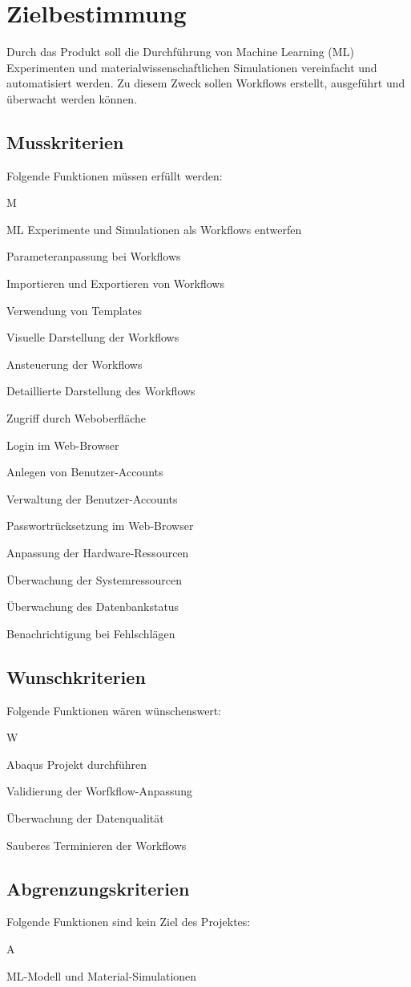 \section{Zielbestimmung} 
Durch das Produkt soll die Durchführung von Machine Learning (ML) Experimenten und materialwissenschaftlichen Simulationen vereinfacht und automatisiert werden. Zu diesem Zweck sollen Workflows erstellt, ausgeführt und überwacht werden können.
\subsection{Musskriterien}
    Folgende Funktionen müssen erfüllt werden:
    \begin{enumPH}{M}
        \item ML Experimente und Simulationen als Workflows entwerfen
        \item Parameteranpassung bei Workflows
        \item Importieren und Exportieren von Workflows
        \item Verwendung von Templates
        \item Visuelle Darstellung der Workflows
        \item Ansteuerung der Workflows
        \item Detaillierte Darstellung des Workflows
        \item Zugriff durch Weboberfläche
        \item Login im Web-Browser
        \item Anlegen von Benutzer-Accounts
        \item Verwaltung der Benutzer-Accounts
        \item Passwortrücksetzung im Web-Browser
        \item Anpassung der Hardware-Ressourcen
        \item Überwachung der Systemressourcen
        \item Überwachung des Datenbankstatus
        \item Benachrichtigung bei Fehlschlägen
    \end{enumPH}
        
        
\subsection{Wunschkriterien}
    Folgende Funktionen wären wünschenswert:
    \begin{enumPH}{W}
        \item Abaqus Projekt durchführen
        \item Validierung der Worfkflow-Anpassung
        \item Überwachung der Datenqualität
        \item Sauberes Terminieren der Workflows
    \end{enumPH}


\subsection{Abgrenzungskriterien}
    Folgende Funktionen sind kein Ziel des Projektes:
    \begin{enumPH}{A}
        \item ML-Modell und Material-Simulationen
    \end{enumPH}

\newpage